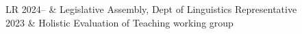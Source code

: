 \documentclass[12pt]{article}
\begin{document}
\begin{longtable}{LR}
  2024--     & Legislative Assembly, Dept of Linguistics Representative\\
  2023       & Holistic Evaluation of Teaching working group
\end{longtable}





\end{document}
